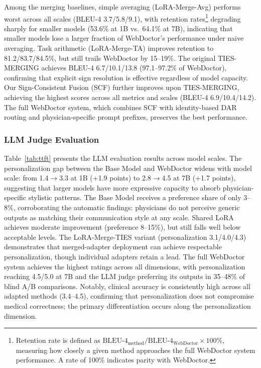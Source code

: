 Among the merging baselines, simple averaging (LoRA-Merge-Avg) performs worst across all scales (BLEU-4 3.7/5.8/9.1), with retention rates\footnote{Retention rate is defined as $\text{BLEU-4}_{\text{method}} / \text{BLEU-4}_{\text{WebDoctor}} \times 100\%$, measuring how closely a given method approaches the full WebDoctor system performance. A rate of 100\% indicates parity with WebDoctor.} degrading sharply for smaller models (53.6\% at 1B vs.\ 64.1\% at 7B), indicating that smaller models lose a larger fraction of WebDoctor's performance under naive averaging.
Task arithmetic (LoRA-Merge-TA) improves retention to 81.2/83.7/84.5\%, but still trails WebDoctor by 15--19\%.
The original TIES-MERGING achieves BLEU-4 6.7/10.1/13.8 (97.1--97.2\% of WebDoctor), confirming that explicit sign resolution is effective regardless of model capacity.
Our Sign-Consistent Fusion (SCF) further improves upon TIES-MERGING, achieving the highest scores across all metrics and scales (BLEU-4 6.9/10.4/14.2).
The full WebDoctor system, which combines SCF with identity-based DAR routing and physician-specific prompt prefixes, preserves the best performance.

\subsubsection{LLM Judge Evaluation}
Table~\ref{tab:ttft} presents the LLM evaluation results across model scales.
The personalization gap between the Base Model and WebDoctor widens with model scale: from 1.4$\rightarrow$3.3 at 1B (+1.9 points) to 2.8$\rightarrow$4.5 at 7B (+1.7 points), suggesting that larger models have more expressive capacity to absorb physician-specific stylistic patterns.
The Base Model receives a preference share of only 3--8\%, corroborating the automatic findings: physicians do not perceive generic outputs as matching their communication style at any scale.
Shared LoRA achieves moderate improvement (preference 8--15\%), but still falls well below acceptable levels.
The LoRA-Merge-TIES variant (personalization 3.1/4.0/4.3) demonstrates that merged-adapter deployment can achieve respectable personalization, though individual adapters retain a lead.
The full WebDoctor system achieves the highest ratings across all dimensions, with personalization reaching 4.5/5.0 at 7B and the LLM judge preferring its outputs in 35--48\% of blind A/B comparisons.
Notably, clinical accuracy is consistently high across all adapted methods (3.4--4.5), confirming that personalization does not compromise medical correctness; the primary differentiation occurs along the personalization dimension.

